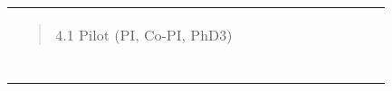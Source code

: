 \begin{longtable}[]{@{}lllllllllll@{}}
\begin{minipage}[t]{0.07\columnwidth}
\begin{quote}
4.1 Pilot (PI, Co-PI, PhD3) \end{quote}\strut \end{minipage} & \begin{minipage}[t]{0.07\columnwidth}\raggedright \strut \end{minipage} & \begin{minipage}[t]{0.07\columnwidth}\raggedright \strut \end{minipage} & \begin{minipage}[t]{0.07\columnwidth}\raggedright \strut \end{minipage} & \begin{minipage}[t]{0.07\columnwidth}\raggedright \strut \end{minipage} & \begin{minipage}[t]{0.07\columnwidth}\raggedright \strut \end{minipage} & \begin{minipage}[t]{0.07\columnwidth}\raggedright \strut \end{minipage} & \begin{minipage}[t]{0.07\columnwidth}\raggedright \strut \end{minipage} & \begin{minipage}[t]{0.07\columnwidth}\raggedright \strut \end{minipage} & \begin{minipage}[t]{0.07\columnwidth}\raggedright \strut \end{minipage} & \begin{minipage}[t]{0.07\columnwidth}\raggedright \strut \end{minipage}\tabularnewline \begin{minipage}[t]{0.07\columnwidth}\raggedright \begin{quote}

\end{quote}
\end{minipage}
\end{longtable}
